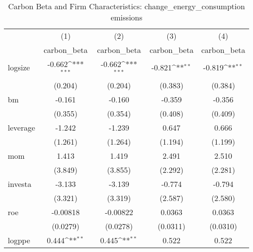 \begin{table}[htbp]\centering
\def\sym#1{\ifmmode^{#1}\else\(^{#1}\)\fi}
\caption{Carbon Beta and Firm Characteristics: change\_energy\_consumption emissions}
\begin{tabular}{l*{4}{c}}
\hline\hline
                    &\multicolumn{1}{c}{(1)}&\multicolumn{1}{c}{(2)}&\multicolumn{1}{c}{(3)}&\multicolumn{1}{c}{(4)}\\
                    &\multicolumn{1}{c}{carbon\_beta}&\multicolumn{1}{c}{carbon\_beta}&\multicolumn{1}{c}{carbon\_beta}&\multicolumn{1}{c}{carbon\_beta}\\
\hline
logsize             &      -0.662\sym{***}&      -0.662\sym{***}&      -0.821\sym{**} &      -0.819\sym{**} \\
                    &     (0.204)         &     (0.204)         &     (0.383)         &     (0.384)         \\
[1em]
bm                  &      -0.161         &      -0.160         &      -0.359         &      -0.356         \\
                    &     (0.355)         &     (0.354)         &     (0.408)         &     (0.409)         \\
[1em]
leverage            &      -1.242         &      -1.239         &       0.647         &       0.666         \\
                    &     (1.261)         &     (1.264)         &     (1.194)         &     (1.199)         \\
[1em]
mom                 &       1.413         &       1.419         &       2.491         &       2.510         \\
                    &     (3.849)         &     (3.855)         &     (2.292)         &     (2.281)         \\
[1em]
investa             &      -3.133         &      -3.139         &      -0.774         &      -0.794         \\
                    &     (3.321)         &     (3.319)         &     (2.587)         &     (2.580)         \\
[1em]
roe                 &    -0.00818         &    -0.00822         &      0.0363         &      0.0363         \\
                    &    (0.0279)         &    (0.0278)         &    (0.0311)         &    (0.0310)         \\
[1em]
logppe              &       0.444\sym{**} &       0.445\sym{**} &       0.522         &       0.522         \\

\end{tabular}
\end{table}

